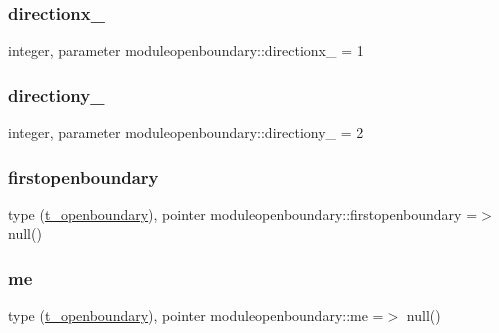 \subsubsection{\texorpdfstring{directionx\+\_\+}{directionx\_}}
{\footnotesize\ttfamily integer, parameter moduleopenboundary\+::directionx\+\_\+ = 1\hspace{0.3cm}{\ttfamily [private]}}

\mbox{\label{namespacemoduleopenboundary_a25093200fa39f8e59e871125514b1a8c}} 
\subsubsection{\texorpdfstring{directiony\+\_\+}{directiony\_}}
{\footnotesize\ttfamily integer, parameter moduleopenboundary\+::directiony\+\_\+ = 2\hspace{0.3cm}{\ttfamily [private]}}

\mbox{\label{namespacemoduleopenboundary_a6692caf14af89aa0ebe8696badd01729}} 
\subsubsection{\texorpdfstring{firstopenboundary}{firstopenboundary}}
{\footnotesize\ttfamily type (\mbox{\hyperlink{structmoduleopenboundary_1_1t__openboundary}{t\+\_\+openboundary}}), pointer moduleopenboundary\+::firstopenboundary =$>$ null()\hspace{0.3cm}{\ttfamily [private]}}

\mbox{\label{namespacemoduleopenboundary_a44c6fe241aef5c76ee470c9d68f19a74}} 
\subsubsection{\texorpdfstring{me}{me}}
{\footnotesize\ttfamily type (\mbox{\hyperlink{structmoduleopenboundary_1_1t__openboundary}{t\+\_\+openboundary}}), pointer moduleopenboundary\+::me =$>$ null()\hspace{0.3cm}{\ttfamily [private]}}


